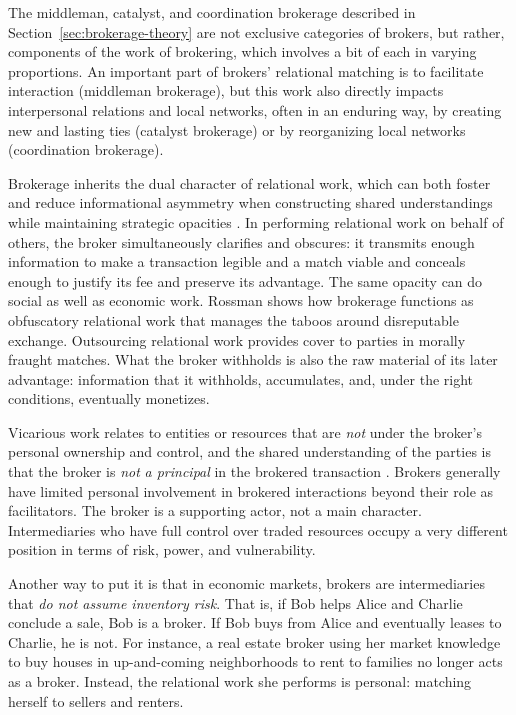 \documentclass[
]{article}
\begin{document}
The middleman, catalyst, and coordination brokerage described in Section~\ref{sec:brokerage-theory} are not exclusive categories of brokers, but rather, components of the work of brokering, which involves a bit of each in varying proportions. An important part of brokers' relational matching is to facilitate interaction (middleman brokerage), but this work also directly impacts interpersonal relations and local networks, often in an enduring way, by creating new and lasting ties (catalyst brokerage) or by reorganizing local networks (coordination brokerage).

Brokerage inherits the dual character of relational work, which can both foster and reduce informational asymmetry when constructing shared understandings while maintaining strategic opacities \autocite[138]{blockRelationalWorkMarket2012}. In performing relational work on behalf of others, the broker simultaneously clarifies and obscures: it transmits enough information to make a transaction legible and a match viable and conceals enough to justify its fee and preserve its advantage. The same opacity can do social as well as economic work. Rossman \autocite*{rossmanObfuscatoryRelationalWork2014} shows how brokerage functions as obfuscatory relational work that manages the taboos around disreputable exchange. Outsourcing relational work provides cover to parties in morally fraught matches. What the broker withholds is also the raw material of its later advantage: information that it withholds, accumulates, and, under the right conditions, eventually monetizes.

Vicarious work relates to entities or resources that are \emph{not} under the broker's personal ownership and control, and the shared understanding of the parties is that the broker is \emph{not} \emph{a principal} in the brokered transaction \autocite[see, e.g.][21326]{stovelStabilizingBrokerage2011}. Brokers generally have limited personal involvement in brokered interactions beyond their role as facilitators. The broker is a supporting actor, not a main character. Intermediaries who have full control over traded resources occupy a very different position in terms of risk, power, and vulnerability.

Another way to put it is that in economic markets, brokers are intermediaries that \emph{do not assume inventory risk}. That is, if Bob helps Alice and Charlie conclude a sale, Bob is a broker. If Bob buys from Alice and eventually leases to Charlie, he is not. For instance, a real estate broker using her market knowledge to buy houses in up-and-coming neighborhoods to rent to families no longer acts as a broker. Instead, the relational work she performs is personal: matching herself to sellers and renters.
\end{document}
